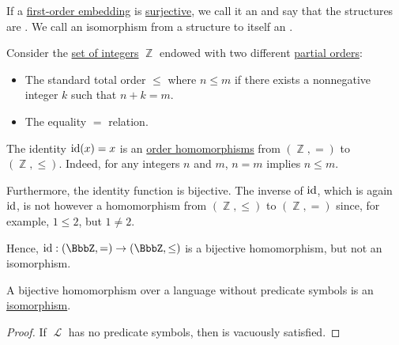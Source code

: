 \begin{definition}\label{def:first_order_isomorphism}
  If a \hyperref[def:first_order_embedding]{first-order embedding} is \hyperref[def:function_invertibility/surjective]{surjective}, we call it an  and say that the structures are . We call an isomorphism from a structure to itself an .
\end{definition}

\begin{example}\label{ex:bijective_order_homomorphism_not_isomorphism}
  Consider the \hyperref[def:integers]{set of integers} \( \BbbZ \) endowed with two different \hyperref[def:partially_ordered_set]{partial orders}:
  \begin{itemize}
    \item The standard total order \( \leq \) where \( n \leq m \) if there exists a nonnegative integer \( k \) such that \( n + k = m \).
    \item The equality \( = \) relation.
  \end{itemize}

  The identity \( \operatorname{id}(x) = x \) is an \hyperref[def:order_homomorphism]{order homomorphisms} from \( (\BbbZ, =) \) to \( (\BbbZ, \leq) \). Indeed, for any integers \( n \) and \( m \), \( n = m \) implies \( n \leq m \).

  Furthermore, the identity function is bijective. The inverse of \( \operatorname{id} \), which is again \( \operatorname{id} \), is not however a homomorphism from \( (\BbbZ, \leq) \) to \( (\BbbZ, =) \) since, for example, \( 1 \leq 2 \), but \( 1 \neq 2 \).

  Hence, \( \id: (\BbbZ, =) \to (\BbbZ, \leq) \) is a bijective homomorphism, but not an isomorphism.
\end{example}

\begin{proposition}\label{thm:automorphism_without_predicate_symbols}
  A bijective homomorphism over a language without predicate symbols is an \hyperref[def:first_order_isomorphism]{isomorphism}.
\end{proposition}
\begin{proof}
  If \( \mscrL \) has no predicate symbols, then  is vacuously satisfied.
\end{proof}

